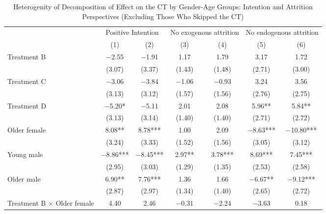 \documentclass[12pt, a4paper]{article}
\begin{document}
\begin{table}

\caption{\label{tab:lm-interaction-gender-age-test-decompose-noskip}Heterogenity of Decomposition of Effect on the CT by Gender-Age Groups: Intention and Attrition Perspectives (Excluding Those Who Skipped the CT)}
\centering
\fontsize{9}{11}\selectfont
\begin{threeparttable}
\begin{tabular}[t]{lcccccc}
\toprule
\multicolumn{1}{c}{ } & \multicolumn{2}{c}{Positive Intention} & \multicolumn{2}{c}{No exogenous attrition} & \multicolumn{2}{c}{No endogenous attrition} \\
\cmidrule(l{3pt}r{3pt}){2-3} \cmidrule(l{3pt}r{3pt}){4-5} \cmidrule(l{3pt}r{3pt}){6-7}
  & (1) & (2) & (3) & (4) & (5) & (6)\\
\midrule
Treatment B & \num{-2.55} & \num{-1.91} & \num{1.17} & \num{1.79} & \num{3.17} & \num{1.72}\\
 & (\num{3.07}) & (\num{3.37}) & (\num{1.43}) & (\num{1.48}) & (\num{2.71}) & (\num{3.00})\\
Treatment C & \num{-3.06} & \num{-3.84} & \num{-1.06} & \num{-0.93} & \num{3.24} & \num{3.56}\\
 & (\num{3.13}) & (\num{3.12}) & (\num{1.57}) & (\num{1.56}) & (\num{2.76}) & (\num{2.75})\\
Treatment D & \num{-5.20}* & \num{-5.11} & \num{2.01} & \num{2.08} & \num{5.96}** & \num{5.84}**\\
 & (\num{3.13}) & (\num{3.14}) & (\num{1.40}) & (\num{1.40}) & (\num{2.71}) & (\num{2.72})\\
Older female & \num{8.08}** & \num{8.78}*** & \num{1.00} & \num{2.09} & \num{-8.63}*** & \num{-10.80}***\\
 & (\num{3.24}) & (\num{3.33}) & (\num{1.52}) & (\num{1.56}) & (\num{3.05}) & (\num{3.12})\\
Young male & \num{-8.86}*** & \num{-8.45}*** & \num{2.97}** & \num{3.78}*** & \num{8.69}*** & \num{7.45}***\\
 & (\num{2.95}) & (\num{3.03}) & (\num{1.29}) & (\num{1.35}) & (\num{2.53}) & (\num{2.58})\\
Older male & \num{6.90}** & \num{7.76}*** & \num{1.36} & \num{1.66} & \num{-6.67}** & \num{-9.12}***\\
 & (\num{2.87}) & (\num{2.97}) & (\num{1.34}) & (\num{1.40}) & (\num{2.65}) & (\num{2.72})\\
Treatment B $\times$ Older female & \num{4.40} & \num{2.46} & \num{-0.31} & \num{-2.24} & \num{-3.63} & \num{0.18}\\

\end{tabular}
\end{threeparttable}
\end{table}
\end{document}
